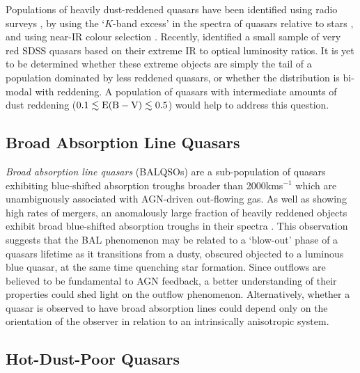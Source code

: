 Populations of heavily dust-reddened quasars have been identified using radio surveys \citep[e.g.][]{glikman12}, by using the `$K$-band excess' in the spectra of quasars relative to stars \citep{maddox12}, and using near-IR colour selection \citep{banerji12,banerji13}. 
Recently, \citet{ross14} identified a small sample of very red SDSS quasars based on their extreme IR to optical luminosity ratios. 
It is yet to be determined whether these extreme objects are simply the tail of a population dominated by less reddened quasars, or whether the distribution is bi-modal with reddening. 
A population of quasars with intermediate amounts of dust reddening ($0.1 \lesssim {\rm E(B-V)} \lesssim 0.5$) would help to address this question. 

\subsection{Broad Absorption Line Quasars}

{\it Broad absorption line quasars} (BALQSOs) are a sub-population of quasars exhibiting blue-shifted absorption troughs broader than 2000kms$^{-1}$ \citep{weymann91} which are unambiguously associated with AGN-driven out-flowing gas. 
As well as showing high rates of mergers, an anomalously large fraction of heavily reddened objects exhibit broad blue-shifted absorption troughs in their spectra \citep{urrutia09, glikman12}. 
This observation suggests that the BAL phenomenon may be related to a `blow-out' phase of a quasars lifetime as it transitions from a dusty, obscured objected to a luminous blue quasar, at the same time quenching star formation. Since outflows are believed to be fundamental to AGN feedback, a better understanding of their properties could shed light on the outflow phenomenon. 
Alternatively, whether a quasar is observed to have broad absorption lines could depend only on the orientation of the observer in relation to an intrinsically anisotropic system.

\subsection{Hot-Dust-Poor Quasars}

